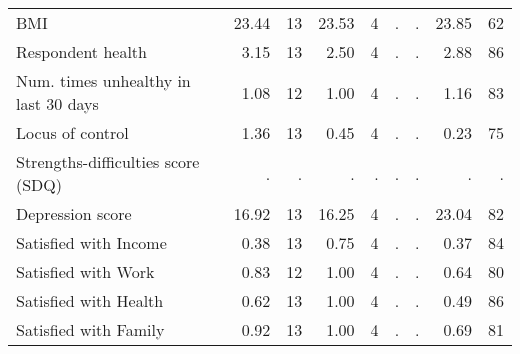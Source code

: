 \begin{tabular}{l r r r r r r r r}
BMI &     23.44 &        13 &     23.53 &         4 &         . & . &     23.85 &        62 \\
Respondent health &      3.15 &        13 &      2.50 &         4 &         . & . &      2.88 &        86 \\
Num. times unhealthy in last 30 days &      1.08 &        12 &      1.00 &         4 &         . & . &      1.16 &        83 \\
Locus of control &      1.36 &        13 &      0.45 &         4 &         . & . &      0.23 &        75 \\
Strengths-difficulties score (SDQ) &         . & . &         . & . &         . & . &         . & . \\
Depression score &     16.92 &        13 &     16.25 &         4 &         . & . &     23.04 &        82 \\
Satisfied with Income &      0.38 &        13 &      0.75 &         4 &         . & . &      0.37 &        84 \\
Satisfied with Work &      0.83 &        12 &      1.00 &         4 &         . & . &      0.64 &        80 \\
Satisfied with Health &      0.62 &        13 &      1.00 &         4 &         . & . &      0.49 &        86 \\
Satisfied with Family &      0.92 &        13 &      1.00 &         4 &         . & . &      0.69 &        81 \\
\bottomrule
\end{tabular}
